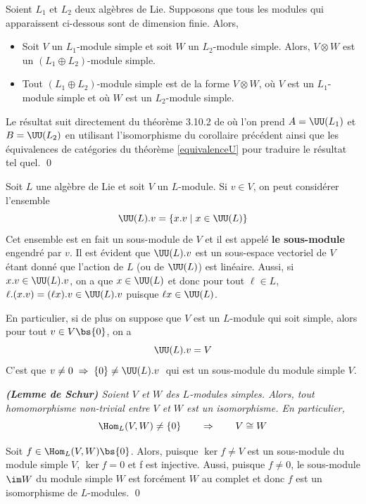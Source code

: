 \begin{Cor} \label{sommelie} Soient $L_1$ et $L_2$ deux algèbres de Lie. Supposons que tous les modules qui apparaissent ci-dessous sont de dimension finie. Alors,
\begin{itemize}
\item[\em(i)] Soit $V$ un $L_1$-module simple et soit $W$ un $L_2$-module simple. Alors, $V \otimes W$ est un \linebreak $(L_1 \oplus L_2)$-module simple.
\item[\em(ii)] Tout $(L_1 \oplus L_2)$-module simple est de la forme $V \otimes W$, où $V$ est un $L_1$-module simple et où $W$ est un $L_2$-module simple.
\end{itemize}
\begin{pre} Le résultat suit directement du théorème 3.10.2 de \cite{Etingof} où l'on prend \linebreak $A = \UU(L_1)$ et $B = \UU(L_2)$ en utilisant l'isomorphisme du corollaire précédent ainsi que les équivalences de catégories du théorème \ref{equivalenceU} pour traduire le résultat tel quel. \qed
\end{pre}
\end{Cor}

Soit $L$ une algèbre de Lie et soit $V$ un $L$-module. Si $v \in V$, on peut considérer l'ensemble
$$ \UU(L).v = \{x.v \; | \; x \in \UU(L)\} $$
Cet ensemble est en fait un sous-module de $V$ et il est appelé \textbf{le sous-module} engendré par $v$. Il est évident que $\UU(L).v$ est un sous-espace vectoriel de $V$ étant donné que l'action de $L$ (ou de $\UU(L)$) est linéaire. Aussi, si $x.v \in \UU(L).v$, on a que $x \in \UU(L)$ et donc pour tout $\ell \in L$, $\ell.(x.v) = (\ell x).v \in \UU(L).v$ puisque $\ell x \in \UU(L)$.

\begin{Rem} En particulier, si de plus on suppose que $V$ est un $L$-module qui soit simple, alors pour tout $v \in V \bs \{0\}$, on a $$ \UU(L).v = V $$
C'est que $v \neq 0 \; \Rightarrow \; \{0\} \neq \UU(L).v \;$ qui est un sous-module du module simple $V$.
\end{Rem}

\begin{Lem} \em \textbf{(Lemme de Schur)} \label{schur} \em Soient $V$ et $W$ des $L$-modules simples. Alors, tout homomorphisme non-trivial entre $V$ et $W$ est un isomorphisme. En particulier,
$$ \Hom_L(V,W) \neq \{0\} \qquad \Rightarrow \qquad V \cong W $$
\begin{pre} Soit $f \in \Hom_L(V,W)\bs\{0\}$. Alors, puisque $\ker f \neq V$ est un sous-module du module simple $V$, $\ker f = 0$ et f est injective. Aussi, puisque $f \neq 0$, le sous-module $\im W$ du module simple $W$ est forcément $W$ au complet et donc $f$ est un isomorphisme de $L$-modules. \qed
\end{pre}
\end{Lem}

